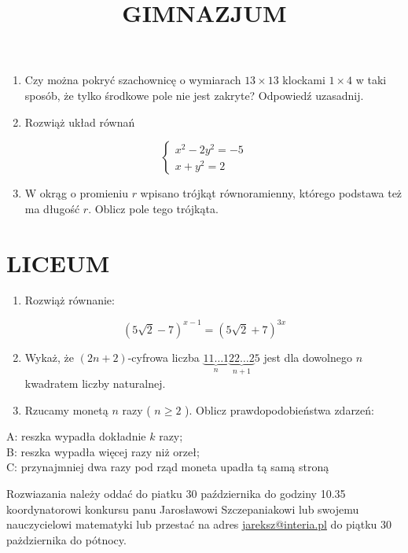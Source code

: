 \documentclass[10pt]{article}
\title{GIMNAZJUM }
\author{}
\date{}
\begin{document}
\maketitle
\begin{enumerate}
  \item Czy można pokryć szachownicę o wymiarach \(13 \times 13\) klockami \(1 \times 4\) w taki sposób, że tylko środkowe pole nie jest zakryte? Odpowiedź uzasadnij.
  \item Rozwiąż układ równań
\end{enumerate}

\[
\left\{\begin{array}{c}
x^{2}-2 y^{2}=-5 \\
x+y^{2}=2
\end{array}\right.
\]

\begin{enumerate}
  \setcounter{enumi}{2}
  \item W okrąg o promieniu \(r\) wpisano trójkąt równoramienny, którego podstawa też ma długość \(r\). Oblicz pole tego trójkąta.
\end{enumerate}

\section*{LICEUM}
\begin{enumerate}
  \item Rozwiąż równanie:
\end{enumerate}

\[
(5 \sqrt{2}-7)^{x-1}=(5 \sqrt{2}+7)^{3 x}
\]

\begin{enumerate}
  \setcounter{enumi}{1}
  \item Wykaż, że \((2 n+2)\)-cyfrowa liczba \(\underbrace{11 \ldots 1}_{n} \underbrace{22 \ldots 2}_{n+1} 5\) jest dla dowolnego \(n\) kwadratem liczby naturalnej.
  \item Rzucamy monetą \(n\) razy ( \(n \geq 2\) ). Oblicz prawdopodobieństwa zdarzeń:
\end{enumerate}

A: reszka wypadła dokładnie \(k\) razy;\\
B: reszka wypadła więcej razy niż orzeł;\\
C: przynajmniej dwa razy pod rząd moneta upadła tą samą stroną

Rozwiazania należy oddać do piatku 30 października do godziny 10.35 koordynatorowi konkursu panu Jarosławowi Szczepaniakowi lub swojemu nauczycielowi matematyki lub przestać na adres \href{mailto:jareksz@interia.pl}{jareksz@interia.pl} do piątku 30 pażdziernika do pótnocy.
\end{document}

